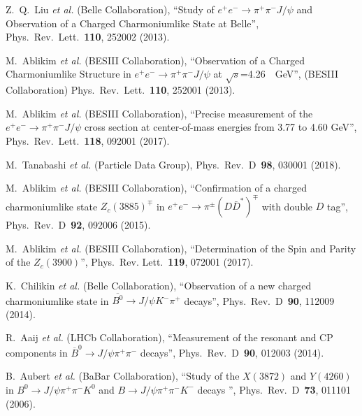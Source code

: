 \documentclass[aps,prd,twocolumn,superscriptaddress,groupedaddress,floatfix]{revtex4}
\begin{document}
 

\begin{thebibliography}{99}



 Z.~Q.~Liu  {\it et al.} (Belle  Collaboration), 
 ``Study of $e^+e^- \rightarrow \pi^+ \pi^-  J/\psi$  and Observation of a Charged Charmoniumlike State at Belle'', 
 Phys.\ Rev.\ Lett.\ {\bf 110}, 252002 (2013).

 M.~Ablikim {\it et al.}   (BESIII Collaboration),
``Observation of a Charged Charmoniumlike Structure in $e^+e^- \rightarrow \pi^+ \pi^-  J/\psi$ 
at $\sqrt s$=4.26~~GeV'', (BESIII Collaboration) Phys.\ Rev.\ Lett.\  {\bf 110}, 252001 (2013).


 M.~Ablikim  {\it et al.}  (BESIII Collaboration),
``Precise measurement of the $e^+e^-\to \pi^+\pi^-J/\psi$  cross section at center-of-mass energies from 3.77 to 4.60 GeV'',
 Phys.\ Rev.\ Lett.\ {\bf 118}, 092001 (2017).

 M.~Tanabashi   {\it et al.}  (Particle Data Group), 
Phys.\ Rev.\ D\ {\bf 98}, 030001 (2018). 


 M.~Ablikim  {\it et al.} (BESIII  Collaboration),
``Confirmation of a charged charmoniumlike state $Z_c(3885)^{\mp}$ in $e^+e^-\to\pi^{\pm}(D\bar{D}^*)^\mp$ with double $D$ tag'',
 Phys.\ Rev.\ D\ {\bf 92}, 092006 (2015).




  M.~Ablikim  {\it et al.}  (BESIII  Collaboration),
   ``Determination of the Spin and Parity of the $Z_c(3900)$'',
 Phys.\ Rev. Lett.\ {\bf 119}, 072001 (2017).



 K.~Chilikin {\it et al.} (Belle  Collaboration),
``Observation of a new charged charmoniumlike state in
 $\overline{B^0}\rightarrow J/\psi K^-\pi^+$ decays'',
 Phys.\ Rev.\ D\ {\bf 90}, 112009 (2014).



 R.~Aaij {\it et al.} (LHCb  Collaboration),
``Measurement of the resonant and CP components in
                        $\overline{B}^0\to J/\psi \pi^+\pi^-$ decays'',
 Phys.\ Rev.\ D\ {\bf 90}, 012003 (2014).


 B.~Aubert {\it et al.} (BaBar Collaboration),
``Study of the $X(3872)$ and $Y(4260)$ in $B^0 \rightarrow J/\psi \pi^+ \pi^- K^0$ and $B \rightarrow J/\psi \pi^+ \pi^- K^-$ decays    '',
 Phys.\ Rev.\ D\ {\bf 73}, 011101 (2006). 


\end{thebibliography}
\end{document}
